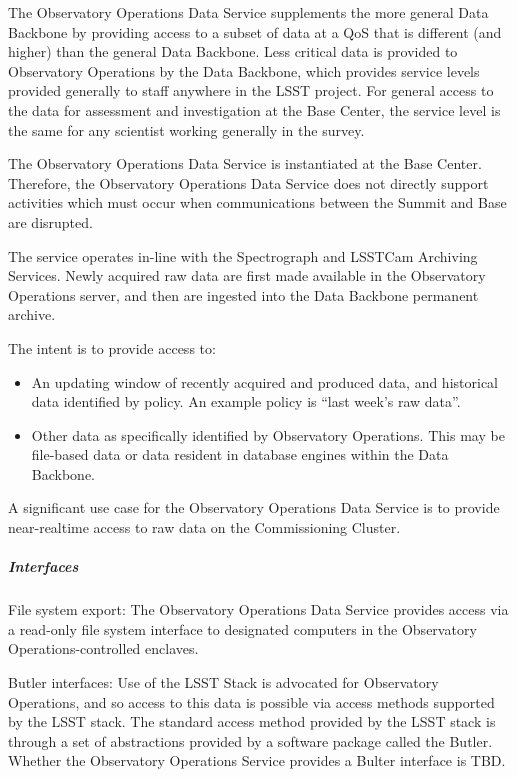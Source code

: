The Observatory Operations Data Service supplements the more general Data
Backbone by providing access to a subset of data at a QoS that is
different (and higher) than the general Data Backbone.  Less critical
data is provided to Observatory Operations by the Data Backbone, which
provides service levels provided generally to staff anywhere in the
LSST project. For general access to the data for assessment and
investigation at the Base Center, the service level is the same for any
scientist working generally in the survey.

The Observatory Operations Data Service is instantiated at the Base
Center. Therefore, the Observatory Operations Data Service does not
directly support activities which must occur when communications
between the Summit and Base are disrupted.

The service operates in-line with the Spectrograph and LSSTCam Archiving
Services. Newly acquired raw data are first made available in the Observatory
Operations server, and then are ingested into the Data Backbone permanent archive.

The intent is to provide access to:

\begin{itemize}

\item An updating window of recently acquired and produced data, and
historical data identified by policy. An example policy is ``last week’s raw data''.

\item Other data as specifically identified  by Observatory Operations.
This may be file-based data or data resident in database engines within
the Data Backbone.

\end{itemize}

A significant use case for the Observatory Operations Data Service is to
provide near-realtime access to raw data on the Commissioning Cluster.

\subparagraph{Interfaces}

File system export: The Observatory Operations Data Service provides access
via a read-only file system interface to designated computers in the
Observatory Operations-controlled enclaves.

Butler interfaces: Use of the LSST Stack is advocated for Observatory Operations,
and so access to this data is possible via access methods supported by the LSST stack.
The standard access method provided by the LSST stack is through a set of
abstractions provided by a software package called the Butler. Whether the Observatory
Operations Service provides a Bulter interface is TBD.

